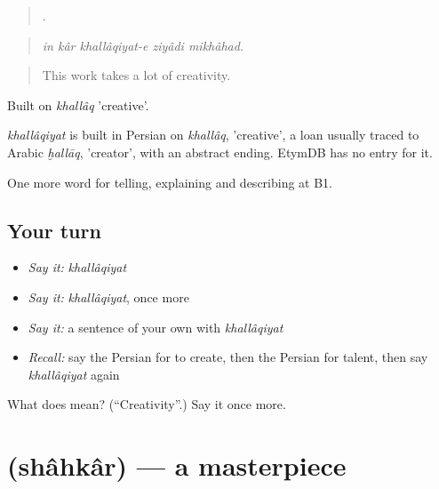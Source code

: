 \begin{quote}
    .
\end{quote}

\begin{quote}
\emph{in kâr khallâqiyat-e ziyâdi mikhâhad.}
\end{quote}

\begin{quote}
This work takes a lot of creativity.
\end{quote}

Built on \emph{khallâq} 'creative'.

\begin{cousinweb}
\emph{khallâqiyat} is built in Persian on \emph{khallâq}, 'creative', a loan usually traced to Arabic \emph{ḫallāq}, 'creator', with an abstract ending. EtymDB has no entry for it.
\end{cousinweb}

\begin{grammarlens}[title={What you've built}]
One more word for telling, explaining and describing at B1.
\end{grammarlens}

\subsection*{Your turn}
\begin{itemize}
\raggedright
  \item \emph{Say it:} \emph{khallâqiyat}
  \item \emph{Say it:} \emph{khallâqiyat}, once more
  \item \emph{Say it:} a sentence of your own with \emph{khallâqiyat}
  \item \emph{Recall:} say the Persian for to create, then the Persian for talent, then say \emph{khallâqiyat} again
\end{itemize}

\begin{tcolorbox}[breakable,colback=teal!4,colframe=teal!35!black,title={Before you move on}]
What does  mean? (\textquotedblleft{}Creativity\textquotedblright{}.) Say it once more.
\end{tcolorbox}
\section[\texorpdfstring{\fa{شاهکار} (shâhkâr)}{شاهکار (shâhkâr)}]{ (shâhkâr) — a masterpiece}

